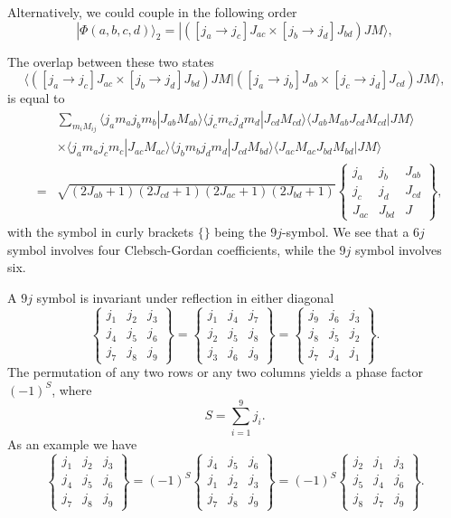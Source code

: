 Alternatively, we could couple in the following order
\[
|\Phi(a,b,c,d)\rangle_2 = | ([j_a\rightarrow j_c]J_{ac}\times [j_b\rightarrow j_d]J_{bd}) JM\rangle, 
\]

The overlap between these two states
\[
\langle([j_a\rightarrow j_c]J_{ac}\times [j_b\rightarrow j_d]J_{bd}) JM| ([j_a\rightarrow j_b]J_{ab}\times [j_c\rightarrow j_d]J_{cd}) JM\rangle, 
\]
is equal to 
\begin{eqnarray}
\nonumber
& & \sum_{m_iM_{ij}}\langle j_am_aj_bm_b|J_{ab}M_{ab}\rangle \langle j_cm_cj_dm_d|J_{cd}M_{cd}\rangle \langle J_{ab}M_{ab}J_{cd}M_{cd}|JM\rangle \\
& & \times\langle j_am_aj_cm_c|J_{ac}M_{ac}\rangle \langle j_bm_bj_dm_d|J_{cd}M_{bd}\rangle \langle J_{ac}M_{ac}J_{bd}M_{bd}|JM\rangle \\  \nonumber
&= & \sqrt{(2J_{ab}+1)(2J_{cd}+1)(2J_{ac}+1)(2J_{bd}+1)}\left\{\begin{array}{ccc} j_a & j_b& J_{ab} \\ j_c & j_d& J_{cd} \\J_{ac} & J_{bd}& J\end{array}\right\}
, \nonumber
\end{eqnarray}
with the symbol in curly brackets $\{\}$ being the $9j$-symbol. We see  that a $6j$ symbol  involves four Clebsch-Gordan coefficients, while the $9j$ symbol
involves six.

A $9j$ symbol is invariant under reflection in either diagonal
\[
    \begin{Bmatrix} j_1 & j_2 & j_3\\ j_4 & j_5 & j_6\\ j_7 & j_8 & j_9 \end{Bmatrix} = \begin{Bmatrix} j_1 & j_4 & j_7\\ j_2 & j_5 & j_8\\ j_3 & j_6 & j_9 \end{Bmatrix} = \begin{Bmatrix} j_9 & j_6 & j_3\\ j_8 & j_5 & j_2\\ j_7 & j_4 & j_1 \end{Bmatrix}. 
\]
The permutation of any two rows or any two columns yields a phase factor $(-1)^S$, where
\[
    S=\sum_{i=1}^9 j_i. 
\]
As an  example we have
\[
    \begin{Bmatrix} j_1 & j_2 & j_3\\ j_4 & j_5 & j_6\\ j_7 & j_8 & j_9 \end{Bmatrix} = (-1)^S \begin{Bmatrix} j_4 & j_5 & j_6\\ j_1 & j_2 & j_3\\ j_7 & j_8 & j_9 \end{Bmatrix} = (-1)^S \begin{Bmatrix} j_2 & j_1 & j_3\\ j_5 & j_4 & j_6\\ j_8 & j_7 & j_9 \end{Bmatrix}. 
\]

